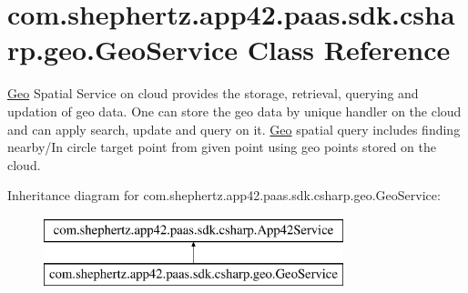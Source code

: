 \hypertarget{classcom_1_1shephertz_1_1app42_1_1paas_1_1sdk_1_1csharp_1_1geo_1_1_geo_service}{\section{com.\+shephertz.\+app42.\+paas.\+sdk.\+csharp.\+geo.\+Geo\+Service Class Reference}
\label{classcom_1_1shephertz_1_1app42_1_1paas_1_1sdk_1_1csharp_1_1geo_1_1_geo_service}
}


\hyperlink{classcom_1_1shephertz_1_1app42_1_1paas_1_1sdk_1_1csharp_1_1geo_1_1_geo}{Geo} Spatial Service on cloud provides the storage, retrieval, querying and updation of geo data. One can store the geo data by unique handler on the cloud and can apply search, update and query on it. \hyperlink{classcom_1_1shephertz_1_1app42_1_1paas_1_1sdk_1_1csharp_1_1geo_1_1_geo}{Geo} spatial query includes finding nearby/\+In circle target point from given point using geo points stored on the cloud.  


Inheritance diagram for com.\+shephertz.\+app42.\+paas.\+sdk.\+csharp.\+geo.\+Geo\+Service\+:\begin{figure}[H]
\begin{center}
\leavevmode
\includegraphics[height=2.000000cm]{classcom_1_1shephertz_1_1app42_1_1paas_1_1sdk_1_1csharp_1_1geo_1_1_geo_service}
\end{center}
\end{figure}
